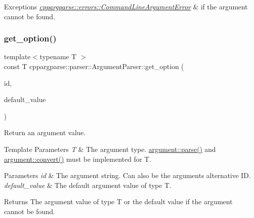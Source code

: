 \begin{DoxyExceptions}{Exceptions}
{\em \hyperlink{classcppargparse_1_1errors_1_1CommandLineArgumentError}{cppargparse\+::errors\+::\+Command\+Line\+Argument\+Error}} & if the argument cannot be found. \\
\hline
\end{DoxyExceptions}
\mbox{\label{classcppargparse_1_1parser_1_1ArgumentParser_a6e13da383b8fdac04a35767abe0f5c32}} 
\subsubsection{\texorpdfstring{get\+\_\+option()}{get\_option()}\hspace{0.1cm}{\footnotesize\ttfamily [2/2]}}
{\footnotesize\ttfamily template$<$typename T $>$ \\
const T cppargparse\+::parser\+::\+Argument\+Parser\+::get\+\_\+option (\begin{DoxyParamCaption}\item[{const std\+::string \&}]{id,  }\item[{const T \&}]{default\+\_\+value }\end{DoxyParamCaption})\hspace{0.3cm}{\ttfamily [inline]}}



Return an argument value. 


\begin{DoxyTemplParams}{Template Parameters}
{\em T} & The argument type. \hyperlink{structcppargparse_1_1argument_a9b5feac6fe8cf18beb63d85c0840cd84}{argument\+::parse()} and \hyperlink{structcppargparse_1_1argument_a2051f71ef4ed0b9d299cc58bb494e42b}{argument\+::convert()} must be implemented for T.\\
\hline
\end{DoxyTemplParams}

\begin{DoxyParams}{Parameters}
{\em id} & The argument string. Can also be the argument\textquotesingle{}s alternative ID. \\
\hline
{\em default\+\_\+value} & The default argument value of type T.\\
\hline
\end{DoxyParams}
\begin{DoxyReturn}{Returns}
The argument value of type T or the default value if the argument cannot be found. 
\end{DoxyReturn}

